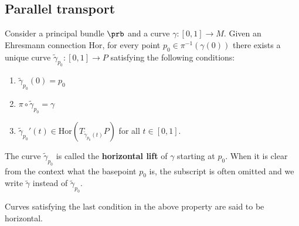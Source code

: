 \subsection{Parallel transport}

    \begin{definition}
        Consider a principal bundle $\prb$ and a curve $\gamma:[0, 1]\rightarrow M$. Given an Ehresmann connection $\text{Hor}$, for every point $p_0\in \pi^{-1}(\gamma(0))$ there exists a unique curve $\widetilde{\gamma}_{p_0}:[0, 1]\rightarrow P$ satisfying the following conditions:
        \begin{enumerate}
            \item $\widetilde{\gamma}_{p_0}(0) = p_0$
            \item $\pi\circ\widetilde{\gamma}_{p_0} = \gamma$
            \item $\widetilde{\gamma}_{p_0}'(t)\in\text{Hor}(T_{\widetilde{\gamma}_{p_0}(t)}P)$ for all $t\in[0, 1]$.
        \end{enumerate}
        The curve $\widetilde{\gamma}_{p_0}$ is called the \textbf{horizontal lift} of $\gamma$ starting at $p_0$. When it is clear from the context what the basepoint $p_0$ is, the subscript is often omitted and we write $\widetilde{\gamma}$ instead of $\widetilde{\gamma}_{p_0}$.
    \end{definition}
    \begin{remark}
        Curves satisfying the last condition in the above property are said to be horizontal.
    \end{remark}

